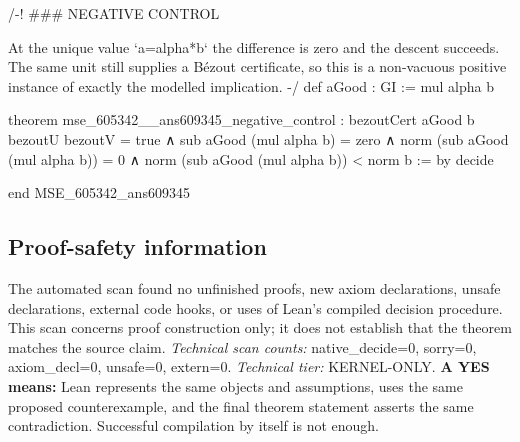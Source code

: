 \documentclass[11pt]{article}
\begin{document}
\begin{Vlean}
/-! ### NEGATIVE CONTROL

At the unique value `a=alpha*b` the difference is zero and the descent succeeds.  The
same unit still supplies a Bézout certificate, so this is a non-vacuous positive instance
of exactly the modelled implication.
-/
def aGood : GI := mul alpha b

theorem mse_605342__ans609345_negative_control :
    bezoutCert aGood b bezoutU bezoutV = true
      ∧ sub aGood (mul alpha b) = zero
      ∧ norm (sub aGood (mul alpha b)) = 0
      ∧ norm (sub aGood (mul alpha b)) < norm b := by
  decide

end MSE_605342_ans609345


\end{Vlean}
\subsection*{Proof-safety information}
The automated scan found no unfinished proofs, new axiom declarations, unsafe declarations, external code hooks, or uses of Lean's compiled decision procedure. This scan concerns proof construction only; it does not establish that the theorem matches the source claim.
\textit{Technical scan counts:} native\_decide=0, sorry=0, axiom\_decl=0, unsafe=0, extern=0. \textit{Technical tier:} KERNEL-ONLY.
\textbf{A YES means:} Lean represents the same objects and assumptions, uses the same proposed counterexample, and the final theorem statement asserts the same contradiction. Successful compilation by itself is not enough.
\clearpage
\end{document}
